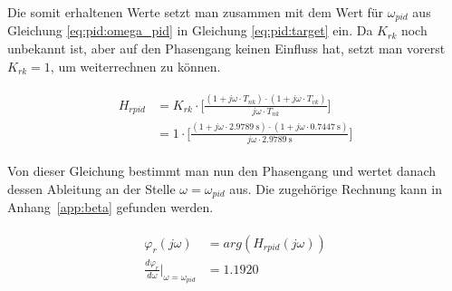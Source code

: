 Die   somit   erhaltenen    Werte   setzt   man   zusammen    mit   dem   Wert
f\"ur  $\omega_{pid}$   aus  Gleichung  \ref{eq:pid:omega_pid}   in  Gleichung
\ref{eq:pid:target}  ein.   Da  $K_{rk}$  noch unbekannt  ist,  aber  auf  den
Phasengang  keinen  Einfluss   hat,  setzt  man  vorerst  $K_{rk}   =  1$,  um
weiterrechnen zu k\"onnen.

\begin{gather} \label{eq:pid:t_nk_t_vk_initial_results}
    \begin{split}
        H_{rpid} & = K_{rk} \cdot \biggl[ \frac{(1 + j\omega \cdot T_{nk}) \cdot (1 + j\omega \cdot T_{vk}) }{ j\omega \cdot T_{nk} } \biggr] \\
                 & = 1      \cdot \biggl[ \frac{(1 + j\omega \cdot \SI{2.9789}{\second}) \cdot (1 + j\omega \cdot \SI{0.7447}{\second}) }{ j\omega \cdot  \SI{2.9789}{\second}} \biggr]
    \end{split}
\end{gather}

Von dieser Gleichung bestimmt man nun  den Phasengang und wertet danach dessen
Ableitung an der Stelle $\omega = \omega_{pid}$ aus. Die zugeh\"orige Rechnung
kann in Anhang~\ref{app:beta} gefunden werden.

\begin{gather} \label{eq:pid:phi_r_first_iteration}
    \begin{split}
        \varphi_r (j\omega)                                            & = arg(H_{rpid}(j\omega))        \\
        \frac{d\varphi_r}{d\omega} \biggr \rvert_{\omega=\omega_{pid}} & = 1.1920
    \end{split}
\end{gather}


